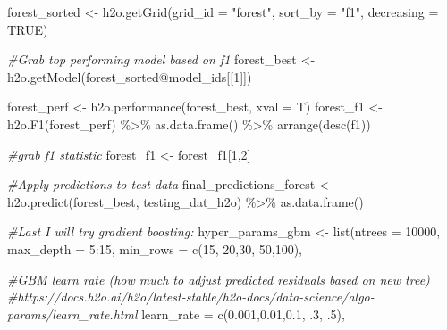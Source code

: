 \documentclass[
]{article}
\newenvironment{Shaded}{\begin{snugshade}}{\end{snugshade}}
\newcommand{\AttributeTok}[1]{\textcolor[rgb]{0.77,0.63,0.00}{#1}}
\newcommand{\CommentTok}[1]{\textcolor[rgb]{0.56,0.35,0.01}{\textit{#1}}}
\newcommand{\ConstantTok}[1]{\textcolor[rgb]{0.00,0.00,0.00}{#1}}
\newcommand{\DecValTok}[1]{\textcolor[rgb]{0.00,0.00,0.81}{#1}}
\newcommand{\FloatTok}[1]{\textcolor[rgb]{0.00,0.00,0.81}{#1}}
\newcommand{\FunctionTok}[1]{\textcolor[rgb]{0.00,0.00,0.00}{#1}}
\newcommand{\NormalTok}[1]{#1}
\newcommand{\OtherTok}[1]{\textcolor[rgb]{0.56,0.35,0.01}{#1}}
\newcommand{\SpecialCharTok}[1]{\textcolor[rgb]{0.00,0.00,0.00}{#1}}
\newcommand{\StringTok}[1]{\textcolor[rgb]{0.31,0.60,0.02}{#1}}
\begin{document}
\begin{Shaded}
\begin{Highlighting}[]
\NormalTok{forest\_sorted }\OtherTok{\textless{}{-}} \FunctionTok{h2o.getGrid}\NormalTok{(}\AttributeTok{grid\_id =} \StringTok{"forest"}\NormalTok{, }\AttributeTok{sort\_by =} \StringTok{"f1"}\NormalTok{, }\AttributeTok{decreasing =} \ConstantTok{TRUE}\NormalTok{)}

\CommentTok{\#Grab top performing model based on f1}
\NormalTok{forest\_best }\OtherTok{\textless{}{-}} \FunctionTok{h2o.getModel}\NormalTok{(forest\_sorted}\SpecialCharTok{@}\NormalTok{model\_ids[[}\DecValTok{1}\NormalTok{]])}

\NormalTok{forest\_perf }\OtherTok{\textless{}{-}} \FunctionTok{h2o.performance}\NormalTok{(forest\_best, }\AttributeTok{xval =}\NormalTok{ T)}
\NormalTok{forest\_f1 }\OtherTok{\textless{}{-}} \FunctionTok{h2o.F1}\NormalTok{(forest\_perf) }\SpecialCharTok{\%\textgreater{}\%}
  \FunctionTok{as.data.frame}\NormalTok{() }\SpecialCharTok{\%\textgreater{}\%}
  \FunctionTok{arrange}\NormalTok{(}\FunctionTok{desc}\NormalTok{(f1)) }

\CommentTok{\#grab f1 statistic}
\NormalTok{forest\_f1 }\OtherTok{\textless{}{-}}\NormalTok{ forest\_f1[}\DecValTok{1}\NormalTok{,}\DecValTok{2}\NormalTok{]}

\CommentTok{\#Apply predictions to test data}
\NormalTok{final\_predictions\_forest }\OtherTok{\textless{}{-}} \FunctionTok{h2o.predict}\NormalTok{(forest\_best, testing\_dat\_h2o) }\SpecialCharTok{\%\textgreater{}\%}
  \FunctionTok{as.data.frame}\NormalTok{()}


\CommentTok{\#Last I will try gradient boosting:}
\NormalTok{hyper\_params\_gbm }\OtherTok{\textless{}{-}} \FunctionTok{list}\NormalTok{(}\AttributeTok{ntrees =} \DecValTok{10000}\NormalTok{,  }
                         \AttributeTok{max\_depth =} \DecValTok{5}\SpecialCharTok{:}\DecValTok{15}\NormalTok{, }
                         \AttributeTok{min\_rows =} \FunctionTok{c}\NormalTok{(}\DecValTok{15}\NormalTok{, }\DecValTok{20}\NormalTok{,}\DecValTok{30}\NormalTok{, }\DecValTok{50}\NormalTok{,}\DecValTok{100}\NormalTok{),}
                         
                         \CommentTok{\#GBM learn rate (how much to adjust predicted residuals based on new tree)}
                         \CommentTok{\#https://docs.h2o.ai/h2o/latest{-}stable/h2o{-}docs/data{-}science/algo{-}params/learn\_rate.html}
                         \AttributeTok{learn\_rate =} \FunctionTok{c}\NormalTok{(}\FloatTok{0.001}\NormalTok{,}\FloatTok{0.01}\NormalTok{,}\FloatTok{0.1}\NormalTok{, .}\DecValTok{3}\NormalTok{, .}\DecValTok{5}\NormalTok{),  }
                         

\end{Highlighting}
\end{Shaded}
\end{document}
